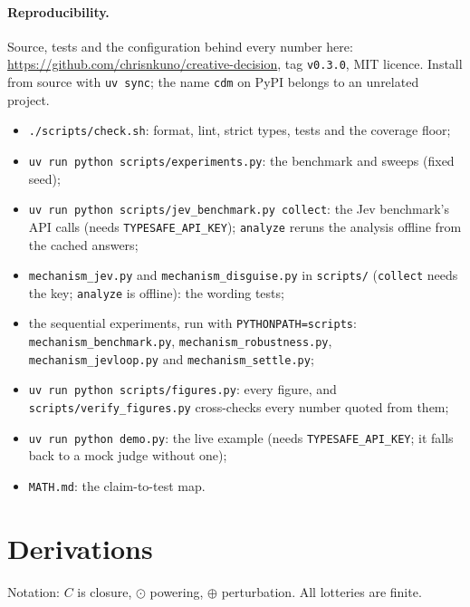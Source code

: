 \documentclass[11pt]{article}
\theoremstyle{definition}
\begin{document}
\paragraph{Reproducibility.} Source, tests and the configuration behind every number here:
\url{https://github.com/chrisnkuno/creative-decision}, tag \texttt{v0.3.0}, MIT licence. Install
from source with \texttt{uv sync}; the name \texttt{cdm} on PyPI belongs to an unrelated project.
\begin{itemize}[leftmargin=1.6em,itemsep=0pt]
\item \texttt{./scripts/check.sh}: format, lint, strict types, tests and the coverage floor;
\item \texttt{uv run python scripts/experiments.py}: the benchmark and sweeps (fixed seed);
\item \texttt{uv run python scripts/jev\_benchmark.py collect}: the Jev benchmark's API calls (needs
\texttt{TYPESAFE\_API\_KEY}); \texttt{analyze} reruns the analysis offline from the cached answers;
\item \texttt{mechanism\_jev.py} and \texttt{mechanism\_disguise.py} in \texttt{scripts/}
(\texttt{collect} needs the key; \texttt{analyze} is offline): the wording tests;
\item the sequential experiments, run with \texttt{PYTHONPATH=scripts}:\\
\texttt{mechanism\_benchmark.py}, \texttt{mechanism\_robustness.py},\\
\texttt{mechanism\_jevloop.py} and \texttt{mechanism\_settle.py};
\item \texttt{uv run python scripts/figures.py}: every figure, and \texttt{scripts/verify\_figures.py}
cross-checks every number quoted from them;
\item \texttt{uv run python demo.py}: the live example (needs \texttt{TYPESAFE\_API\_KEY}; it falls
back to a mock judge without one);
\item \texttt{MATH.md}: the claim-to-test map.
\end{itemize}

\appendix
\section{Derivations}\label{app:proofs}

Notation: $C$ is closure, $\odot$ powering, $\oplus$ perturbation. All lotteries are finite.
\end{document}
